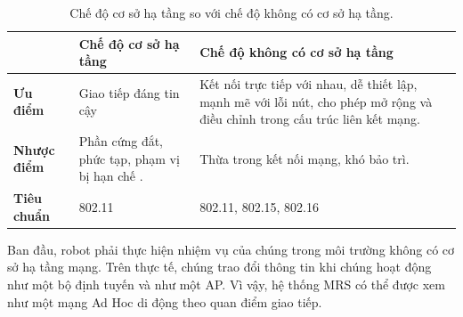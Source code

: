 \documentclass[11pt,openany]{book}
\begin{document}
\begin{table}[H]
    \centering
    \caption{Chế độ cơ sở hạ tầng so với chế độ không có cơ sở hạ tầng.}
    \label{tab:4.1}
    \begin{tabular}{|l|p{4.5cm}|p{4.5cm}|}\hline
                            & \textbf{Chế độ cơ sở hạ tầng}                 & \textbf{Chế độ không có cơ sở hạ tầng}
        \\\hline
        \textbf{Ưu điểm}    & Giao tiếp đáng tin cậy                        & Kết nối trực tiếp với nhau, dễ thiết lập, mạnh mẽ với lỗi nút, cho phép mở rộng và điều chỉnh trong cấu trúc liên kết mạng. \\\hline
        \textbf{Nhược điểm} & Phần cứng đắt, phức tạp, phạm vị bị hạn chế . & Thừa trong kết nối mạng, khó bảo trì.                                                                                       \\\hline
        \textbf{Tiêu chuẩn} & 802.11                                        & 802.11, 802.15, 802.16                                                                                                      \\\hline
    \end{tabular}
\end{table}
Ban đầu, robot phải thực hiện nhiệm vụ của chúng trong môi trường không có cơ sở hạ tầng mạng. Trên thực tế, chúng trao đổi thông tin khi chúng hoạt động như một bộ định tuyến và như một AP. Vì vậy, hệ thống MRS có thể được xem như một mạng Ad Hoc di động theo quan điểm giao tiếp.
\end{document}
